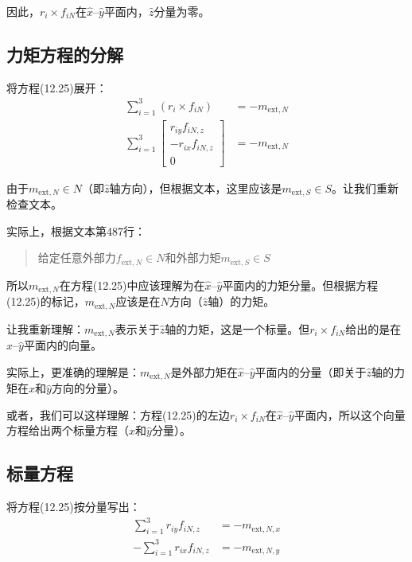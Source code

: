 \documentclass[12pt,a4paper]{article}
\begin{document}
因此，$r_i \times f_{iN}$在$\hat{x}$--$\hat{y}$平面内，$\hat{z}$分量为零。

\subsection{力矩方程的分解}

将方程(12.25)展开：
\begin{align}
\sum_{i=1}^3 (r_i \times f_{iN}) &= -m_{\text{ext},N} \\
\sum_{i=1}^3 \begin{bmatrix} r_{iy} f_{iN,z} \\ -r_{ix} f_{iN,z} \\ 0 \end{bmatrix} &= -m_{\text{ext},N}
\end{align}

由于$m_{\text{ext},N} \in N$（即$\hat{z}$轴方向），但根据文本，这里应该是$m_{\text{ext},S} \in S$。让我们重新检查文本。

实际上，根据文本第487行：
\begin{quote}
给定任意外部力$f_{\text{ext},N} \in N$和外部力矩$m_{\text{ext},S} \in S$
\end{quote}

所以$m_{\text{ext},N}$在方程(12.25)中应该理解为在$\hat{x}$--$\hat{y}$平面内的力矩分量。但根据方程(12.25)的标记，$m_{\text{ext},N}$应该是在$N$方向（$\hat{z}$轴）的力矩。

让我重新理解：$m_{\text{ext},N}$表示关于$\hat{z}$轴的力矩，这是一个标量。但$r_i \times f_{iN}$给出的是在$\hat{x}$--$\hat{y}$平面内的向量。

实际上，更准确的理解是：$m_{\text{ext},N}$是外部力矩在$\hat{x}$--$\hat{y}$平面内的分量（即关于$\hat{z}$轴的力矩在$\hat{x}$和$\hat{y}$方向的分量）。

或者，我们可以这样理解：方程(12.25)的左边$r_i \times f_{iN}$在$\hat{x}$--$\hat{y}$平面内，所以这个向量方程给出两个标量方程（$\hat{x}$和$\hat{y}$分量）。

\subsection{标量方程}

将方程(12.25)按分量写出：
\begin{align}
\sum_{i=1}^3 r_{iy} f_{iN,z} &= -m_{\text{ext},N,x} \label{eq:scalar2} \\
-\sum_{i=1}^3 r_{ix} f_{iN,z} &= -m_{\text{ext},N,y} \label{eq:scalar3}
\end{align}
\end{document}

